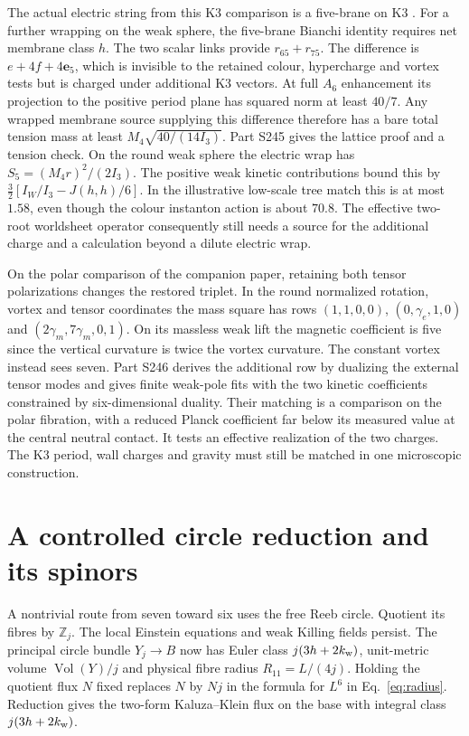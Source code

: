 \documentclass[aps,prd,reprint,onecolumn,nofootinbib,amsmath,amssymb]{revtex4-2}
\begin{document}
The actual electric string from this K3 comparison is a five-brane on K3 \cite{CherkisSchwarz1997K3}. For a further wrapping on the weak sphere, the five-brane Bianchi identity requires net membrane class $h$. The two scalar links provide $r_{65}+r_{75}$. The difference is $e+4f+4\mathbf e_5$, which is invisible to the retained colour, hypercharge and vortex tests but is charged under additional K3 vectors. At full $A_6$ enhancement its projection to the positive period plane has squared norm at least $40/7$. Any wrapped membrane source supplying this difference therefore has a bare total tension mass at least $M_4\sqrt{40/(14 I_3)}$. Part S245 gives the lattice proof and a tension check. On the round weak sphere the electric wrap has $S_5=(M_4r)^2/(2I_3)$. The positive weak kinetic contributions bound this by $\tfrac32[I_W/I_3-J(h,h)/6]$. In the illustrative low-scale tree match this is at most $1.58$, even though the colour instanton action is about $70.8$. The effective two-root worldsheet operator consequently still needs a source for the additional charge and a calculation beyond a dilute electric wrap.

On the polar comparison of the companion paper, retaining both tensor polarizations changes the restored triplet. In the round normalized rotation, vortex and tensor coordinates the mass square has rows $(1,1,0,0)$, $(0,\gamma_e,1,0)$ and $(2\gamma_m,7\gamma_m,0,1)$. On its massless weak lift the magnetic coefficient is five since the vertical curvature is twice the vortex curvature. The constant vortex instead sees seven. Part S246 derives the additional row by dualizing the external tensor modes and gives finite weak-pole fits with the two kinetic coefficients constrained by six-dimensional duality. Their matching is a comparison on the polar fibration, with a reduced Planck coefficient far below its measured value at the central neutral contact. It tests an effective realization of the two charges. The K3 period, wall charges and gravity must still be matched in one microscopic construction.

\section{A controlled circle reduction and its spinors}
A nontrivial route from seven toward six uses the free Reeb circle. Quotient its fibres by $\mathbb Z_j$. The local Einstein equations and weak Killing fields persist. The principal circle bundle $Y_j\to B$ now has Euler class $j(3h+2k_{\rm w})$, unit-metric volume $\operatorname{Vol}(Y)/j$ and physical fibre radius $R_{11}=L/(4j)$. Holding the quotient flux $N$ fixed replaces $N$ by $Nj$ in the formula for $L^6$ in Eq.~\eqref{eq:radius}. Reduction gives the two-form Kaluza--Klein flux on the base with integral class $j(3h+2k_{\rm w})$.
\end{document}
